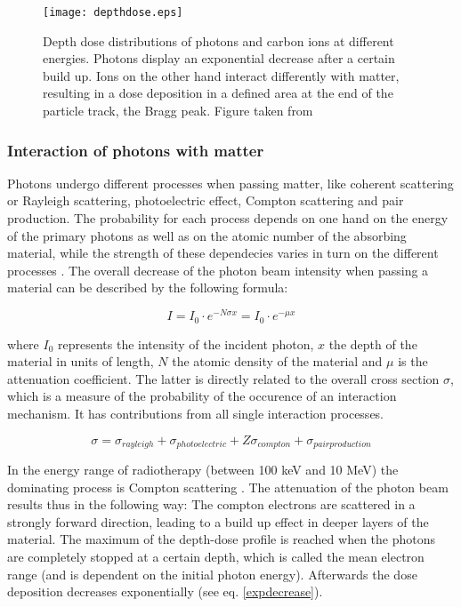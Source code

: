 \documentclass[type=dr, dr=rernat, accentcolor=tud7b,colorbacktitle, bigchapter, openright, twoside, 12pt ]{tudthesis}
\begin{document}
\newpage
 
\vspace*{1cm}
 
\begin{figure}[H]
\begin{center}
\texttt{[image: depthdose.eps]}
\caption{Depth dose distributions of photons and carbon ions at different energies. Photons display an exponential decrease after a certain 
build up. Ions on the other hand interact differently with matter, resulting in a dose deposition in a defined area at the end of the particle 
track, the Bragg peak. Figure taken from \cite{Lue12}}
\label{ddp}
\end{center}
\end{figure}

\subsubsection{Interaction of photons with matter}

Photons undergo different processes when passing matter, like coherent scattering or Rayleigh scattering, photoelectric effect, Compton 
scattering and pair production. The probability for each process depends on one hand on the energy of the primary photons as well as on the 
atomic number of the absorbing material, while the strength of these dependecies varies in turn on the different processes \cite{Lil06}. 
The overall decrease of the photon beam intensity when passing a material can be described by the following formula:

\begin{equation}
 I = I_{0} \cdot e^{- N \sigma x} = I_{0} \cdot e^{-\mu x}
 \label{expdecrease}
\end{equation} 

where $I_{0}$ represents the intensity of the incident photon, $x$ the depth of the material in units of length, $N$ the atomic density 
of the material and $\mu$ is the attenuation coefficient. The latter is directly related to the overall cross section $\sigma$, which is a 
measure of the probability of the occurence of an interaction mechanism. It has contributions from all single interaction processes. 

\begin{equation}
{\sigma} = \sigma_{rayleigh} + \sigma_{photoelectric} + Z\sigma_{compton} + \sigma_{pairproduction} 
\end{equation}

In the energy range of radiotherapy (between 100 keV and 10 MeV) the dominating process is Compton scattering \cite{Alp98}. 
The attenuation of the photon beam results thus in the following way: 
The compton electrons are scattered in a strongly forward direction, leading to a build up effect in deeper layers of the material. The 
maximum of the depth-dose profile is reached when the photons are completely stopped at a certain depth, which is called the mean electron 
range (and is dependent on the initial photon energy). Afterwards the dose deposition decreases exponentially (see eq. \ref{expdecrease}). 
\end{document}

